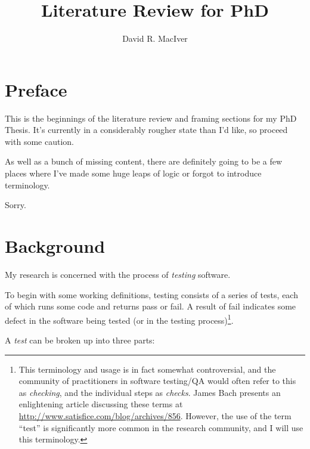 

\title{Literature Review for PhD}
\author{David R. MacIver}



\maketitle

\tableofcontents

\chapter*{Preface}

This is the beginnings of the literature review and framing sections for my PhD Thesis.
It's currently in a considerably rougher state than I'd like,
so proceed with some caution.

As well as a bunch of missing content,
there are definitely going to be a few places where I've made some huge leaps of logic or forgot to introduce terminology.

Sorry.

\chapter{Background}\label{chap:introduction}

My research is concerned with the process of \emph{testing} software.

To begin with some working definitions,
testing consists of a series of tests,
each of which runs some code and returns pass or fail.
A result of fail indicates some defect in the software being tested (or in the testing process)\footnote{
This terminology and usage is in fact somewhat controversial,
and the community of practitioners in software testing/QA would often refer to this as \emph{checking},
and the individual steps as \emph{checks}.
James Bach presents an enlightening article discussing these terms at \url{http://www.satisfice.com/blog/archives/856}.
However,
the use of the term ``test'' is significantly more common in the research community,
and I will use this terminology.
}.

A \emph{test} can be broken up into three parts:

